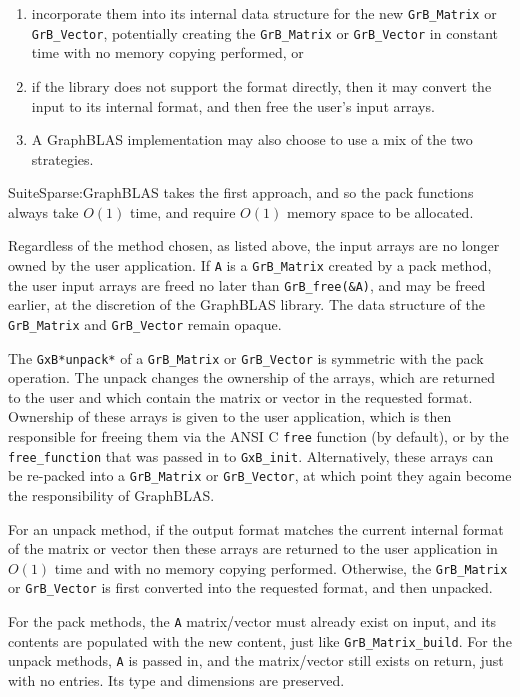 \documentclass[12pt]{article}
\begin{document}
\begin{enumerate}
\item incorporate them
into its internal data structure for the new \verb'GrB_Matrix' or
\verb'GrB_Vector', potentially creating the \verb'GrB_Matrix' or
\verb'GrB_Vector' in constant time with no memory copying performed, or
\item if
the library does not support the format directly, then it may convert
the input to its internal format, and then free the user's input arrays.
\item A
GraphBLAS implementation may also choose to use a mix of the two strategies.
\end{enumerate}

SuiteSparse:GraphBLAS takes the first approach, and so the pack
functions always take $O(1)$ time, and require $O(1)$ memory space to be
allocated.

Regardless of the method chosen, as listed above, the input arrays are no
longer owned by the user application.  If \verb'A' is a \verb'GrB_Matrix'
created by a pack method, the user input arrays are freed no later than
\verb'GrB_free(&A)', and may be freed earlier, at the discretion of the
GraphBLAS library.  The data structure of the \verb'GrB_Matrix' and
\verb'GrB_Vector' remain opaque.

The \verb'GxB*unpack*' of a \verb'GrB_Matrix' or \verb'GrB_Vector' is symmetric with the
pack operation.  The unpack changes the ownership of the arrays, which are
returned to the user and which contain the
matrix or vector in the requested format.  Ownership of these arrays is given
to the user application, which is then responsible for freeing them via the
ANSI C \verb'free' function (by default), or by the \verb'free_function' that
was passed in to \verb'GxB_init'.  Alternatively, these arrays can be
re-packed into a \verb'GrB_Matrix' or \verb'GrB_Vector', at which point they
again become the responsibility of GraphBLAS.

For an unpack method, if the output format matches the current internal format of the
matrix or vector then these arrays are returned to the user application in
$O(1)$ time and with no memory copying performed.  Otherwise, the
\verb'GrB_Matrix' or \verb'GrB_Vector' is first converted into the requested
format, and then unpacked.

For the pack methods, the \verb'A' matrix/vector must already exist on input, and its contents are
populated with the new content, just like \verb'GrB_Matrix_build'.
For the unpack
methods, \verb'A' is passed in, and the matrix/vector still exists on return,
just with no entries.  Its type and dimensions are preserved.
\end{document}
